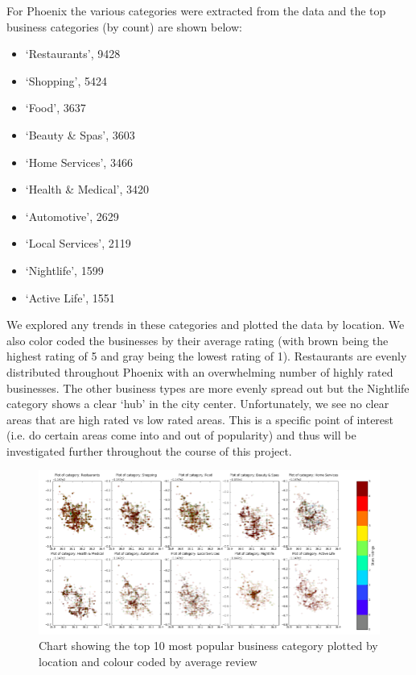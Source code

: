 \documentclass[11pt]{article}
\begin{document}
\par For Phoenix the various categories were extracted from the data and the top business categories (by count) are shown below:
\begin{itemize}
	\item `Restaurants', 9428
	\item `Shopping', 5424
	\item `Food', 3637
	\item `Beauty \& Spas', 3603
	\item `Home Services', 3466
	\item `Health \& Medical', 3420
	\item `Automotive', 2629
	\item `Local Services', 2119
	\item `Nightlife', 1599
	\item `Active Life', 1551
\end{itemize}

We explored any trends in these categories and plotted the data by location. We also color coded the businesses by their average rating (with brown being the highest rating of 5 and gray being the lowest rating of 1). Restaurants are evenly distributed throughout Phoenix with an overwhelming number of highly rated businesses. The other business types are more evenly spread out but the Nightlife category shows a clear `hub' in the city center. Unfortunately, we see no clear areas that are high rated vs low rated areas. This is a specific point of interest (i.e. do certain areas come into and out of popularity) and thus will be investigated further throughout the course of this project.

\begin{figure}[H]
\centering
\includegraphics[width=1.1\textwidth]{./ac209/phxstarsbycategorylocation.png}
\caption{Chart showing the top 10 most popular business category plotted by location and colour coded by average review}
\end{figure}
\end{document}
